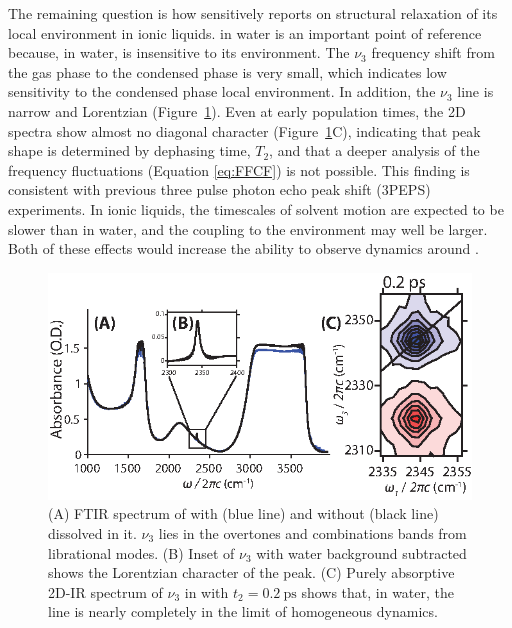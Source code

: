 The remaining question is how sensitively  reports on structural relaxation of its local environment in ionic liquids.  in water is an important point of reference because, in water,  is insensitive to its environment. The  \(\nu_3\) frequency shift from the gas phase to the condensed phase is very small, which indicates low sensitivity to the condensed phase local environment.  In addition, the  \(\nu_3\) line is narrow and Lorentzian (Figure~\ref{fig:CO2 in water}). Even at early population times, the 2D spectra show almost no diagonal character (Figure~\ref{fig:CO2 in water}C), indicating that peak shape is determined by dephasing time, \(T_2\), and that a deeper analysis of the frequency fluctuations (Equation \ref{eq:FFCF}) is not possible. This finding is consistent with previous three pulse photon echo peak shift (3PEPS) experiments.\cite{Hamm1998} In ionic liquids, the timescales of solvent motion are expected to be slower than in water, and the coupling to the environment may well be larger. Both of these effects would increase the ability to observe dynamics around .

\begin{figure}
  \centering
  \includegraphics[scale=1.25]{./paper_01/fig1.eps}
  \caption[Linear and 2D-IR of Carbon Dioxide in Water]{\label{fig:CO2 in water}(A) FTIR spectrum of  with (blue line) and without (black line)  dissolved in it.  \(\nu_3\) lies in the overtones and combinations bands from  librational modes. (B) Inset of \(\nu_3\) with water background subtracted shows the Lorentzian character of the peak. (C) Purely absorptive 2D-IR spectrum of \(\nu_3\) in  with \(t_2 = \SI{0.2}{\ps}\) shows that, in water, the line is nearly completely in the limit of homogeneous dynamics.}
\end{figure}

